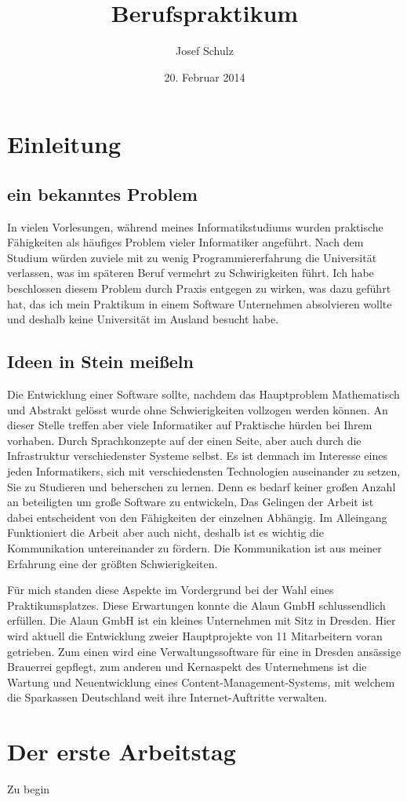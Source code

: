 \documentclass{scrartcl}
\title{Berufspraktikum}
\author{Josef Schulz}
\date{20. Februar 2014}
\begin{document}
 
\maketitle
\tableofcontents

\newpage

\section{Einleitung}

\subsection{ein bekanntes Problem}

In vielen Vorlesungen, während meines Informatikstudiums wurden praktische Fähigkeiten als häufiges Problem 
vieler Informatiker angeführt. 
Nach dem Studium würden zuviele mit zu wenig Programmiererfahrung die Universität verlassen, was im späteren
Beruf vermehrt zu Schwirigkeiten führt. Ich habe beschlossen diesem Problem durch Praxis entgegen zu wirken,
was dazu geführt hat, das ich mein Praktikum in einem Software Unternehmen absolvieren wollte und deshalb
keine Universität im Ausland besucht habe.

\subsection{Ideen in Stein meißeln}

Die Entwicklung einer Software sollte, nachdem das Hauptproblem Mathematisch und Abstrakt gelösst wurde ohne
Schwierigkeiten vollzogen werden können. An dieser Stelle treffen aber viele Informatiker auf Praktische
hürden bei Ihrem vorhaben. Durch Sprachkonzepte auf der einen Seite, aber auch durch die Infrastruktur
verschiedenster Systeme selbst.
Es ist demnach im Interesse eines jeden Informatikers, sich mit verschiedensten Technologien auseinander zu
setzen, Sie zu Studieren und beherschen zu lernen.
Denn es bedarf keiner großen Anzahl an beteiligten um große Software zu entwickeln, Das Gelingen der Arbeit ist dabei
entscheident von den Fähigkeiten der einzelnen Abhängig.
Im Alleingang Funktioniert die Arbeit aber auch nicht, deshalb ist es wichtig die Kommunikation untereinander zu fördern.
Die Kommunikation ist aus meiner Erfahrung eine der größten Schwierigkeiten.

Für mich standen diese Aspekte im Vordergrund bei der Wahl eines Praktikumsplatzes.
Diese Erwartungen konnte die Alaun GmbH schlussendlich erfüllen. 
Die Alaun GmbH ist ein kleines Unternehmen mit Sitz in Dresden. 
Hier wird aktuell die Entwicklung zweier Hauptprojekte von 11 Mitarbeitern voran getrieben.
Zum einen wird eine Verwaltungssoftware für eine in Dresden ansässige Brauerrei gepflegt,
zum anderen und Kernaspekt des Unternehmens ist die Wartung und Neuentwicklung eines Content-Management-Systems,
mit welchem die Sparkassen Deutschland weit ihre Internet-Auftritte verwalten. 


\section{Der erste Arbeitstag}

Zu begin

 
\end{document}
